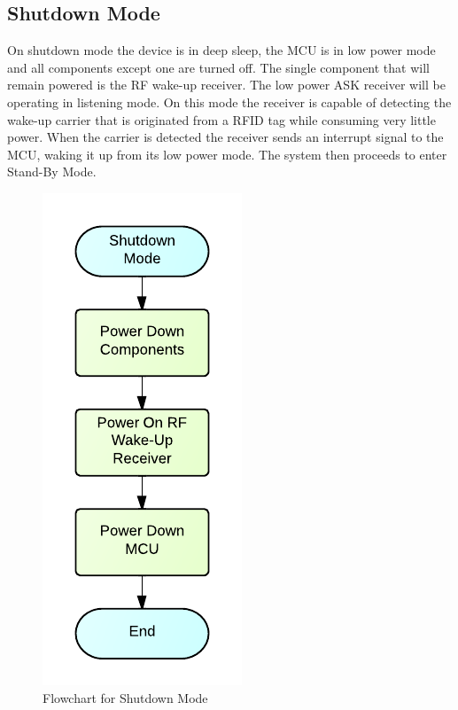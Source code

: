 \subsection{Shutdown Mode}
On shutdown mode the device is in deep sleep, the MCU is in low power mode and all components except one are turned off. The single component that will remain powered is the RF wake-up receiver. The low power ASK receiver will be operating in listening mode. On this mode the receiver is capable of detecting the wake-up carrier that is originated from a RFID tag while consuming very little power. When the carrier is detected the receiver sends an interrupt signal to the MCU, waking it up from its low power mode. The system then proceeds to enter Stand-By Mode.
\begin{figure}[H]
	\centering
	\includegraphics[scale=1.0]{img/ShutdownMode}
	\caption{Flowchart for Shutdown Mode \label{fig:shutdownMode}}
\end{figure}

